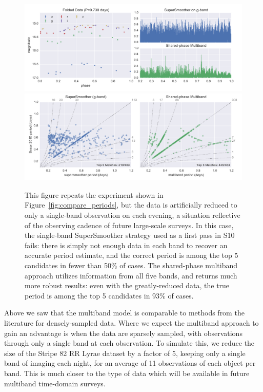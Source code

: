 \documentclass[12pt,preprint]{aastex}
\newcommand{\Fig}[1]{Figure~\ref{fig:#1}}
\newcommand{\fig}[1]{\Fig{#1}}
\newcommand{\figlabel}[1]{\label{fig:#1}}
\begin{document}
\begin{figure}
  \centering
  \includegraphics[width=\textwidth]{fig08a.pdf}
  \includegraphics[width=\textwidth]{fig08b.pdf}
  \caption{
    This figure repeats the experiment shown in \fig{compare_periods}, but the data is artificially reduced to only a single-band observation on each evening, a situation reflective of the observing cadence of future large-scale surveys.
    In this case, the single-band SuperSmoother strategy used as a first pass in S10 fails: there is simply not enough data in each band to recover an accurate period estimate, and the correct period is among the top 5 candidates in fewer than 50\% of cases.
    The shared-phase multiband approach utilizes information from all five bands, and returns much more robust results: even with the greatly-reduced data, the true period is among the top 5 candidates in 93\% of cases.
  } 
  \figlabel{compare_periods_reduced}
\end{figure}

Above we saw that the multiband model is comparable to methods from the literature for densely-sampled data. Where we expect the multiband approach to gain an advantage is when the data are sparsely sampled, with observations through only a single band at each observation. To simulate this, we reduce the size of the Stripe 82 RR Lyrae dataset by a factor of 5, keeping only a single band of imaging each night, for an average of 11 observations of each object per band. This is much closer to the type of data which will be available in future multiband time-domain surveys.
\end{document}
